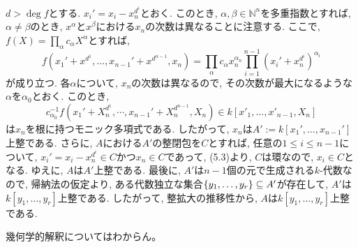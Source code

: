 \documentclass[dvipdfmx]{jsarticle}
\begin{document}
\begin{problem}
\begin{enumerate}
            $d > \deg{f}$とする.
            $x_i' = x_i - x_n^{d^i}$とおく.
            このとき, $\alpha, \beta \in \mathbb{N}^n$を多重指数とすれば,
            $\alpha \neq \beta$のとき, $x^\alpha$と$x^\beta$における$x_n$の次数は異なることに注意する.
            ここで, $f(X) = \prod_{\alpha} c_{\alpha} X^\alpha$とすれば,
            \[
                f(x_1' + x^{d^1}, \dots, x_{n-1}' + x^{d^{n-1}}, x_n) = \prod_{\alpha} c_\alpha x_n^{\alpha_n} \prod_{i = 1}^{n-1} (x_i' + x_n^{d^i})^{\alpha_i}
            \]
            が成り立つ.
            各$\alpha$について, $x_n$の次数は異なるので, その次数が最大になるような$\alpha$を$\alpha_0$とおく.
            このとき,
            \[
                c_{\alpha_0}^{-1}f(x_1' + X^{d^1}_n, \cdots, x_{n-1}' + X_n^{d^{n-1}}, X_n) \in k[x'_1,\dots,x'_{n-1}, X_n]
            \]
            は$x_n$を根に持つモニック多項式である.
            したがって, $x_n$は$A' := k[x_1', \dots, x_{n-1}']$上整である.
            さらに, $A$における$A'$の整閉包を$C$とすれば,
            任意の$1 \leq i \leq n-1$について,
            $x_i' = x_i - x_n^{d^i} \in C$かつ$x_n \in C$であって, (5.3)より, $C$は環なので,
            $x_i \in C$となる.
            ゆえに, $A$は$A'$上整である.
            最後に, $A'$は$n-1$個の元で生成される$k$-代数なので, 帰納法の仮定より,
            ある代数独立な集合$\{y_1, \dots, y_r\} \subseteq A'$が存在して,
            $A'$は$k[y_1, \dots, y_r]$上整である.
            したがって, 整拡大の推移性から, $A$は$k[y_1, \dots, y_r]$上整である.
        \end{enumerate}
        \color{red}
        幾何学的解釈についてはわからん。
        \color{black}
    \end{problem}
\end{document}
